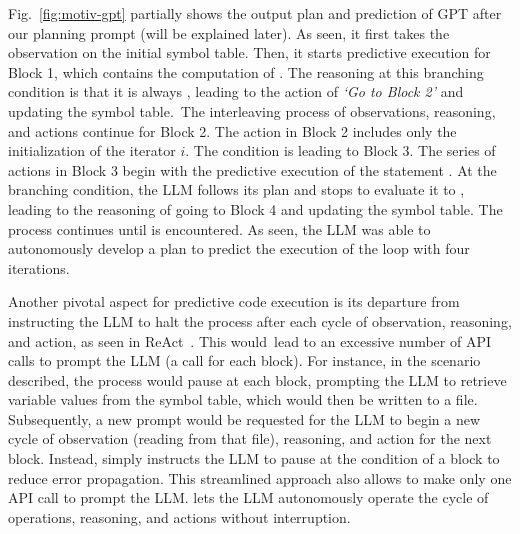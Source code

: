 



Fig.~\ref{fig:motiv-gpt} partially shows the output plan and
prediction of GPT after our planning prompt (will be explained
later).
As seen, it first takes the observation on the initial symbol
table. Then, it starts predictive execution for Block 1, which
contains the computation of .  The reasoning at this
branching condition is that it is always , leading to the
action of {\em `Go to Block 2'} and updating the symbol table.~The
interleaving process of observations, reasoning, and actions
continue for Block 2. The action in Block 2 includes only the
initialization of the iterator $i$.  The condition is 
leading to Block 3.  The series of actions in Block 3 begin with the
predictive execution of the statement . At the
branching condition, the LLM follows its plan and stops to evaluate it
to , leading to the reasoning of going to Block 4 and
updating the symbol table.  The process continues until
 is encountered.  As seen, the LLM was able to
autonomously develop a plan to predict the execution of the loop with
four iterations.

Another pivotal aspect for predictive code
execution is its departure from instructing the LLM
to halt the process after each cycle of observation, reasoning, and
action, as seen in ReAct~\cite{yao2023react}. This would~lead
to an excessive number of API calls to prompt the LLM (a call for each
block). For instance, in the scenario described, the process would
pause at each block, prompting the LLM to retrieve variable values
from the symbol table, which would then be written to a
file. Subsequently, a new prompt would be requested for the LLM to
begin a new cycle of observation (reading from that file),
reasoning, and action for the next block. Instead, {\orca}
simply instructs the LLM to pause at the condition of a block to
reduce error propagation. This streamlined approach also allows
{\orca} to make only one API call to prompt the LLM. {\orca} lets the LLM autonomously operate the cycle of operations,
reasoning, and actions without interruption.

